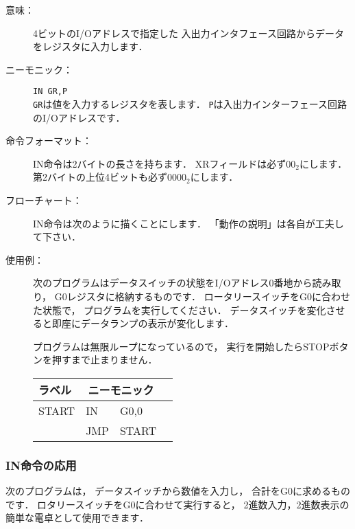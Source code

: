 \begin{description}
\item[意味：]4ビットのI/Oアドレスで指定した
入出力インタフェース回路からデータをレジスタに入力します．

\item[ニーモニック：]{\tt IN  GR,P} \\
{\tt GR}は値を入力するレジスタを表します．
{\tt P}は入出力インターフェース回路のI/Oアドレスです．

\item[命令フォーマット：]IN命令は2バイトの長さを持ちます．
XRフィールドは必ず$00_2$にします．
第2バイトの上位4ビットも必ず$0000_2$にします．


\item[フローチャート：]IN命令は次のように描くことにします．
「動作の説明」は各自が工夫して下さい．

\begin{center}
\end{center}

\item[使用例：]
次のプログラムはデータスイッチの状態をI/Oアドレス0番地から読み取り，
G0レジスタに格納するものです．
ロータリースイッチをG0に合わせた状態で，
プログラムを実行してください．
データスイッチを変化させると即座にデータランプの表示が変化します．

プログラムは無限ループになっているので，
実行を開始したらSTOPボタンを押すまで止まりません．

{\tt\small\begin{center}
\begin{tabular}{|l|l l|l}
\cline{1-3}
ラベル & \multicolumn{2}{|c|}{ニーモニック} \\
\hline
START & IN   & G0,0    \\
      & JMP  & START   \\ 
\hline
\end{tabular}
\end{center}}


\end{description}

\subsubsection{IN命令の応用}
次のプログラムは，
データスイッチから数値を入力し，
合計をG0に求めるものです．
ロタリースイッチをG0に合わせて実行すると，
2進数入力，2進数表示の簡単な電卓として使用できます．

